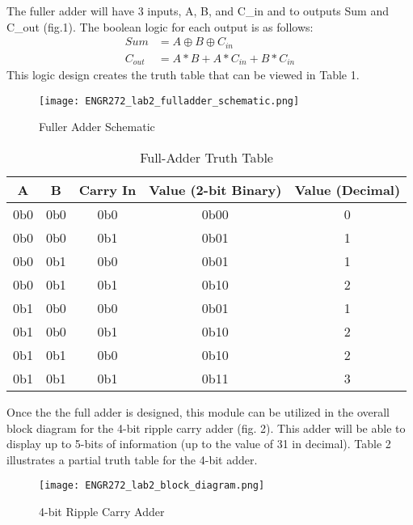 \documentclass[11pt]{article}
\begin{document}
The fuller adder will have 3 inputs, A, B, and C\_in and to outputs Sum and C\_out (fig.1). The boolean logic for each output is as follows:
\begin{align*}
    Sum &= A \oplus B \oplus C_{in} \\
    C_{out} &= A*B + A*C_{in} + B*C_{in}
\end{align*}
This logic design creates the truth table that can be viewed in Table 1. 
\begin{figure}[H]
  \centering
  \texttt{[image: ENGR272\_lab2\_fulladder\_schematic.png]}
  \caption{Fuller Adder Schematic}
  \label{fig:1}
\end{figure}
\begin{table}[H]
    \centering
    \begin{tabular}{|c|c|c|c|c|}
    \hline
    A & B & Carry In & Value (2-bit Binary) & Value (Decimal) \\ \hline
    0b0 & 0b0 & 0b0 & 0b00 & 0 \\ \hline
    0b0 & 0b0 & 0b1 & 0b01 & 1 \\ \hline
    0b0 & 0b1 & 0b0 & 0b01 & 1 \\ \hline
    0b0 & 0b1 & 0b1 & 0b10 & 2 \\ \hline
    0b1 & 0b0 & 0b0 & 0b01 & 1 \\ \hline
    0b1 & 0b0 & 0b1 & 0b10 & 2 \\ \hline
    0b1 & 0b1 & 0b0 & 0b10 & 2 \\ \hline
    0b1 & 0b1 & 0b1 & 0b11 & 3 \\ \hline
    \end{tabular}
    \caption{Full-Adder Truth Table}
\end{table}
Once the the full adder is designed, this module can be utilized in the overall block diagram for the 4-bit ripple carry adder (fig. 2). This adder will be able to display up to 5-bits of information (up to the value of 31 in decimal). Table 2 illustrates a partial truth table for the 4-bit adder.

\begin{figure}[H]
  \centering
  \texttt{[image: ENGR272\_lab2\_block\_diagram.png]}
  \caption{4-bit Ripple Carry Adder}
  \label{fig:2}
\end{figure}
\end{document}
